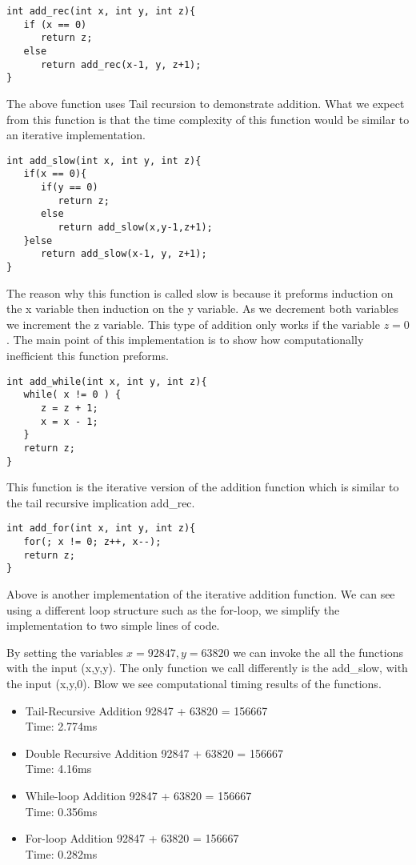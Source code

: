 \documentclass{article}
\begin{document}
\begin{lstlisting}
int add_rec(int x, int y, int z){ 
   if (x == 0)
      return z;
   else
      return add_rec(x-1, y, z+1);
}
\end{lstlisting}
The above function uses Tail recursion to demonstrate addition. What we expect from this function is that the time complexity of this function would be similar to an iterative implementation. 

\begin{lstlisting}
int add_slow(int x, int y, int z){ 
   if(x == 0){ 
      if(y == 0)
         return z;
      else
         return add_slow(x,y-1,z+1);
   }else
      return add_slow(x-1, y, z+1);
}
\end{lstlisting}
The reason why this function is called slow is because it preforms induction on the x variable then induction on the y variable. As we decrement both variables we increment the z variable. This type of addition only works if the variable $z = 0$. The main point of this implementation is to show how computationally inefficient this function preforms. 

 \begin{lstlisting}
int add_while(int x, int y, int z){ 
   while( x != 0 ) { 
      z = z + 1;  
      x = x - 1;  
   }   
   return z;
}
\end{lstlisting}
This function is the iterative version of the addition function which is similar to the tail recursive implication add\_rec. 

\begin{lstlisting}
int add_for(int x, int y, int z){
   for(; x != 0; z++, x--);
   return z;
}
\end{lstlisting}
Above is another implementation of the iterative addition function. We can see using a different loop structure such as the for-loop, we simplify the implementation to two simple lines of code. 

By setting the variables $x = 92847, y = 63820$ we can invoke the all the functions with the input (x,y,y). The only function we call differently is the add\_slow, with the input (x,y,0). Blow we see computational timing results of the functions. 

\begin{itemize}
\item Tail-Recursive Addition		92847 + 63820 = 156667 \\Time: 2.774ms


\item Double Recursive Addition		92847 + 63820 = 156667\\Time: 4.16ms


\item While-loop Addition			92847 + 63820 = 156667 \\Time: 0.356ms


\item For-loop Addition				92847 + 63820 = 156667\\Time: 0.282ms
\end{itemize}
\end{document}

